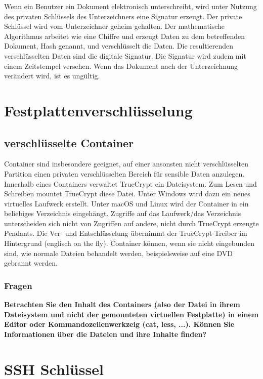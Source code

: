 \documentclass[12pt,a4paper]{article}
\begin{document}
Wenn ein Benutzer ein Dokument elektronisch unterschreibt, wird unter Nutzung des privaten Schlüssels des Unterzeichners eine Signatur erzeugt. Der private Schlüssel wird vom Unterzeichner geheim gehalten. Der mathematische Algorithmus arbeitet wie eine Chiffre und erzeugt Daten zu dem betreffenden Dokument, Hash genannt, und verschlüsselt die Daten. Die resultierenden verschlüsselten Daten sind die digitale Signatur. Die Signatur wird zudem mit einem Zeitstempel versehen. Wenn das Dokument nach der Unterzeichnung verändert wird, ist es ungültig.
\bigskip
\section{Festplattenverschlüsselung}
\subsection{verschlüsselte Container}
Container sind insbesondere geeignet, auf einer ansonsten nicht verschlüsselten Partition einen privaten verschlüsselten Bereich für sensible Daten anzulegen. Innerhalb eines Containers verwaltet TrueCrypt ein Dateisystem. Zum Lesen und Schreiben mountet TrueCrypt diese Datei. Unter Windows wird dazu ein neues virtuelles Laufwerk erstellt. Unter macOS und Linux wird der Container in ein beliebiges Verzeichnis eingehängt. Zugriffe auf das Laufwerk/das Verzeichnis unterscheiden sich nicht von Zugriffen auf andere, nicht durch TrueCrypt erzeugte Pendants. Die Ver- und Entschlüsselung übernimmt der TrueCrypt-Treiber im Hintergrund (englisch on the fly). Container können, wenn sie nicht eingebunden sind, wie normale Dateien behandelt werden, beispielsweise auf eine DVD gebrannt werden.
\subsubsection{Fragen}
\textbf{Betrachten Sie den Inhalt des Containers (also der Datei in ihrem Dateisystem und nicht der gemounteten virtuellen Festplatte) in einem Editor oder Kommandozeilenwerkzeig (cat, less, ...). Können Sie Informationen über die Dateien und ihre Inhalte finden?}




\bigskip
\section{SSH Schlüssel}
\end{document}
